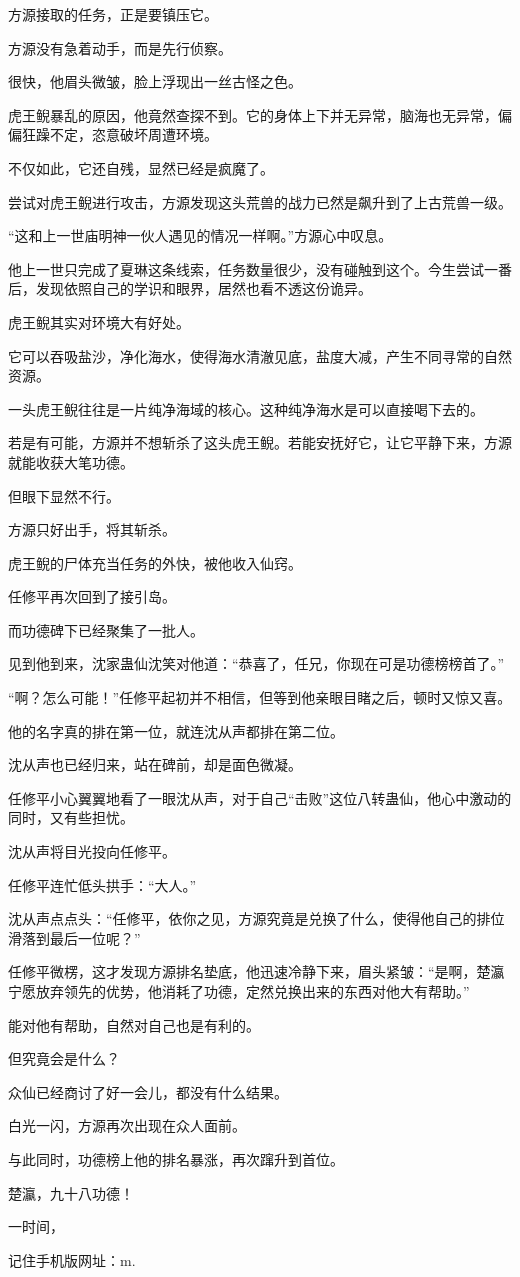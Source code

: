 \begin{this_body}
方源接取的任务，正是要镇压它。

方源没有急着动手，而是先行侦察。

很快，他眉头微皱，脸上浮现出一丝古怪之色。

虎王鲵暴乱的原因，他竟然查探不到。它的身体上下并无异常，脑海也无异常，偏偏狂躁不定，恣意破坏周遭环境。

不仅如此，它还自残，显然已经是疯魔了。

尝试对虎王鲵进行攻击，方源发现这头荒兽的战力已然是飙升到了上古荒兽一级。

“这和上一世庙明神一伙人遇见的情况一样啊。”方源心中叹息。

他上一世只完成了夏琳这条线索，任务数量很少，没有碰触到这个。今生尝试一番后，发现依照自己的学识和眼界，居然也看不透这份诡异。

虎王鲵其实对环境大有好处。

它可以吞吸盐沙，净化海水，使得海水清澈见底，盐度大减，产生不同寻常的自然资源。

一头虎王鲵往往是一片纯净海域的核心。这种纯净海水是可以直接喝下去的。

若是有可能，方源并不想斩杀了这头虎王鲵。若能安抚好它，让它平静下来，方源就能收获大笔功德。

但眼下显然不行。

方源只好出手，将其斩杀。

虎王鲵的尸体充当任务的外快，被他收入仙窍。

任修平再次回到了接引岛。

而功德碑下已经聚集了一批人。

见到他到来，沈家蛊仙沈笑对他道：“恭喜了，任兄，你现在可是功德榜榜首了。”

“啊？怎么可能！”任修平起初并不相信，但等到他亲眼目睹之后，顿时又惊又喜。

他的名字真的排在第一位，就连沈从声都排在第二位。

沈从声也已经归来，站在碑前，却是面色微凝。

任修平小心翼翼地看了一眼沈从声，对于自己“击败”这位八转蛊仙，他心中激动的同时，又有些担忧。

沈从声将目光投向任修平。

任修平连忙低头拱手：“大人。”

沈从声点点头：“任修平，依你之见，方源究竟是兑换了什么，使得他自己的排位滑落到最后一位呢？”

任修平微楞，这才发现方源排名垫底，他迅速冷静下来，眉头紧皱：“是啊，楚瀛宁愿放弃领先的优势，他消耗了功德，定然兑换出来的东西对他大有帮助。”

能对他有帮助，自然对自己也是有利的。

但究竟会是什么？

众仙已经商讨了好一会儿，都没有什么结果。

白光一闪，方源再次出现在众人面前。

与此同时，功德榜上他的排名暴涨，再次蹿升到首位。

楚瀛，九十八功德！

一时间，

记住手机版网址：m.

\end{this_body}

